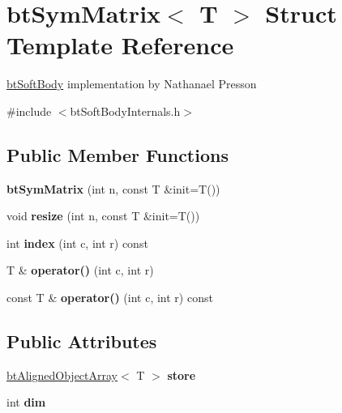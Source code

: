 \hypertarget{structbtSymMatrix}{}\section{bt\+Sym\+Matrix$<$ T $>$ Struct Template Reference}
\label{structbtSymMatrix}


\hyperlink{classbtSoftBody}{bt\+Soft\+Body} implementation by Nathanael Presson  




{\ttfamily \#include $<$bt\+Soft\+Body\+Internals.\+h$>$}

\subsection*{Public Member Functions}
\begin{DoxyCompactItemize}
\item 
\mbox{\label{structbtSymMatrix_a7192c984f685ad2a430afcaa38f1fdb9}} 
{\bfseries bt\+Sym\+Matrix} (int n, const T \&init=T())
\item 
\mbox{\label{structbtSymMatrix_a68877451540992ba8acc0ffec7d235d7}} 
void {\bfseries resize} (int n, const T \&init=T())
\item 
\mbox{\label{structbtSymMatrix_a1a0a26aed447de929bbf9c602e20208a}} 
int {\bfseries index} (int c, int r) const
\item 
\mbox{\label{structbtSymMatrix_a07e3f3a1061aa88ea2b5ceb552d98309}} 
T \& {\bfseries operator()} (int c, int r)
\item 
\mbox{\label{structbtSymMatrix_adbefb8bb2307c6c0c2e2aa2978a6a7b8}} 
const T \& {\bfseries operator()} (int c, int r) const
\end{DoxyCompactItemize}
\subsection*{Public Attributes}
\begin{DoxyCompactItemize}
\item 
\mbox{\label{structbtSymMatrix_a4c427356119bee0ee579c2f68e8e8887}} 
\hyperlink{classbtAlignedObjectArray}{bt\+Aligned\+Object\+Array}$<$ T $>$ {\bfseries store}
\item 
\mbox{\label{structbtSymMatrix_a2ac56e0e7d0342e9889c613c143cb27a}} 
int {\bfseries dim}
\end{DoxyCompactItemize}


